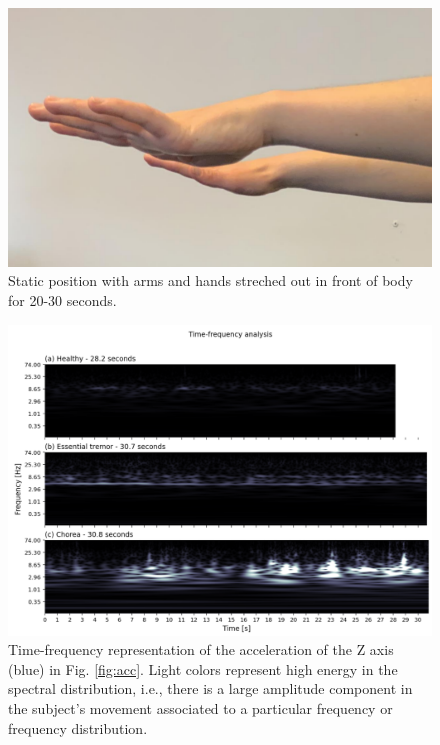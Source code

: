 \begin{figure}[ht]
\centering
\includegraphics[width=.5\linewidth]{figures/nemo/hands.png}
\caption{Static position with arms and hands streched out in front of body for 20-30 seconds.}
\label{fig:hands}
\end{figure}

\begin{figure}[ht]
\centering
\includegraphics[width=\linewidth]{figures/nemo/freq2.png}
\caption{Time-frequency representation of the acceleration of the Z axis (blue) in Fig. \ref{fig:acc}. Light colors represent high energy in the spectral distribution, i.e., there is a large amplitude component in the subject's movement associated to a particular frequency or frequency distribution.}
\label{fig:freq}
\end{figure}
